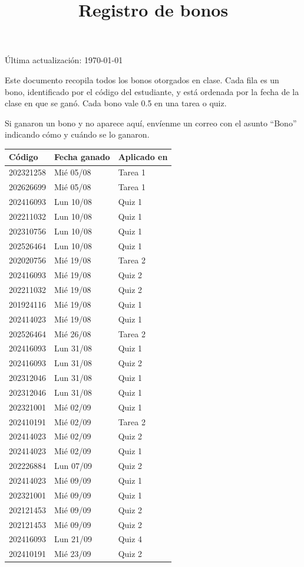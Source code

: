 \documentclass{doc}
\title{Registro de bonos}
\begin{document}
\makedocheader

Última actualización: \today

Este documento recopila todos los bonos otorgados en clase. Cada fila es un bono, identificado por el código del estudiante, y está ordenada por la fecha de la clase en que se ganó. Cada bono vale 0.5 en una tarea o quiz.

Si ganaron un bono y no aparece aquí, envíenme un correo con el asunto ``Bono'' indicando cómo y cuándo se lo ganaron.

\begin{center}
\small
\begin{tabular}{l l l}
\toprule
\textbf{Código} & \textbf{Fecha ganado} & \textbf{Aplicado en} \\
\midrule
202321258 & Mié 05/08 & Tarea 1 \\
202626699 & Mié 05/08 & Tarea 1 \\
202416093 & Lun 10/08 & Quiz 1 \\
202211032 & Lun 10/08 & Quiz 1 \\
202310756 & Lun 10/08 & Quiz 1 \\
202526464 & Lun 10/08 & Quiz 1 \\
202020756 & Mié 19/08 & Tarea 2 \\
202416093 & Mié 19/08 & Quiz 2 \\
202211032 & Mié 19/08 & Quiz 2 \\
201924116 & Mié 19/08 & Quiz 1 \\
202414023 & Mié 19/08 & Quiz 1 \\
202526464 & Mié 26/08 & Tarea 2 \\
202416093 & Lun 31/08 & Quiz 1 \\
202416093 & Lun 31/08 & Quiz 2 \\
202312046 & Lun 31/08 & Quiz 1 \\
202312046 & Lun 31/08 & Quiz 1 \\
202321001 & Mié 02/09 & Quiz 1 \\
202410191 & Mié 02/09 & Tarea 2 \\
202414023 & Mié 02/09 & Quiz 2 \\
202414023 & Mié 02/09 & Quiz 1 \\
202226884 & Lun 07/09 & Quiz 2 \\
202414023 & Mié 09/09 & Quiz 1 \\
202321001 & Mié 09/09 & Quiz 1 \\
202121453 & Mié 09/09 & Quiz 2 \\
202121453 & Mié 09/09 & Quiz 2 \\
202416093 & Lun 21/09 & Quiz 4 \\
202410191 & Mié 23/09 & Quiz 2 \\
\bottomrule
\end{tabular}
\end{center}
\end{document}
